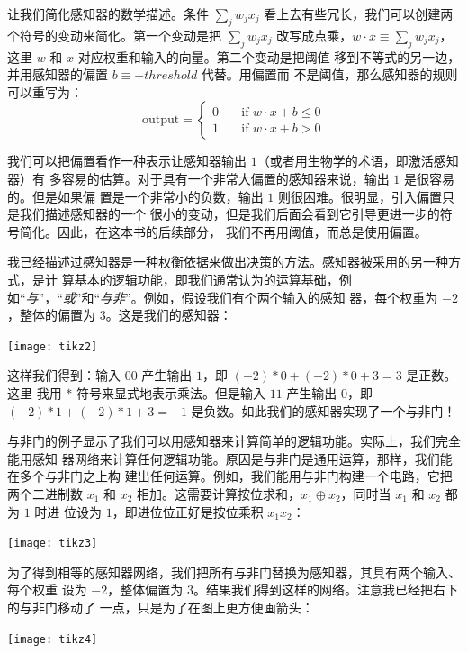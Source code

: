 让我们简化感知器的数学描述。条件 $\sum_j w_j x_j$ 看上去有些冗长，我们可以创建两
个符号的变动来简化。第一个变动是把 $\sum_j w_j x_j$ 改写成点乘，$w \cdot x
\equiv \sum_j w_j x_j$，这里 $w$ 和 $x$ 对应权重和输入的向量。第二个变动是把阈值
移到不等式的另一边，并用感知器的偏置 $b \equiv -threshold$ 代替。用偏置而
不是阈值，那么感知器的规则可以重写为：
\begin{equation}
  \text{output} = \begin{cases}
    0 & \quad \text{if } w\cdot x + b \leq 0 \\
    1 & \quad \text{if } w\cdot x + b > 0
  \end{cases}
  \tag{2}
\end{equation}

我们可以把偏置看作一种表示让感知器输出 $1$（或者用生物学的术语，即激活感知器）有
多容易的估算。对于具有一个非常大偏置的感知器来说，输出 $1$ 是很容易的。但是如果偏
置是一个非常小的负数，输出 $1$ 则很困难。很明显，引入偏置只是我们描述感知器的一个
很小的变动，但是我们后面会看到它引导更进一步的符号简化。因此，在这本书的后续部分，
我们不再用阈值，而总是使用偏置。

我已经描述过感知器是一种权衡依据来做出决策的方法。感知器被采用的另一种方式，是计
算基本的逻辑功能，即我们通常认为的运算基础，例
如“\emph{与}”，“\emph{或}”和“\emph{与非}”。例如，假设我们有个两个输入的感知
器，每个权重为 $-2$，整体的偏置为 $3$。这是我们的感知器：
\begin{center}
  \texttt{[image: tikz2]}
\end{center}

这样我们得到：输入 $00$ 产生输出 $1$，即 $(-2)*0 + (-2)*0 + 3 = 3$ 是正数。这里
我用 $*$ 符号来显式地表示乘法。但是输入 $11$ 产生输出 $0$，即 $(-2)*1 + (-2)*1
+ 3 = -1$ 是负数。如此我们的感知器实现了一个与非门！

与非门的例子显示了我们可以用感知器来计算简单的逻辑功能。实际上，我们完全能用感知
器网络来计算任何逻辑功能。原因是与非门是通用运算，那样，我们能在多个与非门之上构
建出任何运算。例如，我们能用与非门构建一个电路，它把两个二进制数 $x_1$ 和 $x_2$
相加。这需要计算按位求和，$x_1 \oplus x_2$，同时当 $x_1$ 和 $x_2$ 都为 $1$ 时进
位设为 $1$，即进位位正好是按位乘积 $x_1x_2$：
\begin{center}
  \texttt{[image: tikz3]}
\end{center}

为了得到相等的感知器网络，我们把所有与非门替换为感知器，其具有两个输入、每个权重
设为 $-2$，整体偏置为 $3$。结果我们得到这样的网络。注意我已经把右下的与非门移动了
一点，只是为了在图上更方便画箭头：
\begin{center}
  \texttt{[image: tikz4]}
\end{center}

